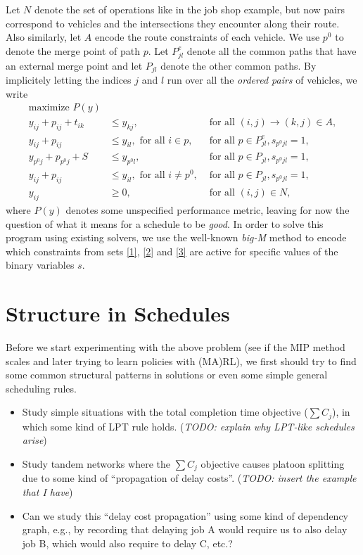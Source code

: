 \documentclass{article}
\begin{document}
Let $N$ denote the set of operations like in the job shop example, but now pairs
correspond to vehicles and the intersections they encounter along their route.
Also similarly, let $A$ encode the route constraints of each vehicle. We use
$p^{0}$ to denote the merge point of path $p$. Let $P_{jl}^{e}$ denote all the
common paths that have an external merge point and let $P_{jl}$ denote the other
common paths. By implicitely letting the indices $j$ and $l$ run over all the
\textit{ordered pairs} of vehicles, we write
%
\begin{subequations}
\begin{align}
  \text{maximize } P(y) \\
  y_{ij} + p_{ij} + t_{ik} &\leq y_{kj}, & \text{ for all } (i,j) \xrightarrow{} (k,j) \in A, \\
  \label{1} y_{ij} + p_{ij} &\leq y_{il}, \text{ for all } i \in p, &\text{ for all } p \in P_{jl}^{e}, s_{p^{0}jl} = 1, \\
  \label{2} y_{p^{0}j} + p_{p^{0}j} + S &\leq y_{p^{0}l},  &\text{ for all } p \in P_{jl}, s_{p^{0}jl} = 1, \\
  \label{3} y_{ij} + p_{ij} &\leq y_{il}, \text{ for all } i \neq p^{0}, &\text{ for all } p \in P_{jl}, s_{p^{0}jl} = 1, \\
  y_{ij} &\geq 0, & \text{ for all } (i,j) \in N ,
\end{align}
\end{subequations}
where $P(y)$ denotes some unspecified performance metric, leaving for now the
question of what it means for a schedule to be \textit{good}.
In order to solve this program using existing solvers, we use the well-known
\textit{big-M} method to encode which constraints from sets \eqref{1}, \eqref{2}
and \eqref{3} are active for specific values of the binary variables $s$.


\section{Structure in Schedules}

Before we start experimenting with the above problem (see if the MIP method
scales and later trying to learn policies with (MA)RL), we first should try to
find some common structural patterns in solutions or even some simple general
scheduling rules.

\begin{itemize}
  \item Study simple situations with the total completion time objective ($\sum C_{j}$), in which some kind of LPT rule holds. (\textit{TODO: explain why LPT-like schedules arise})
  \item Study tandem networks where the $\sum C_{j}$ objective causes platoon splitting due to some kind of ``propagation of delay costs''. (\textit{TODO: insert the example that I have})
  \item Can we study this ``delay cost propagation'' using some kind of dependency graph, e.g., by recording that delaying job A would require us to also delay job B, which would also require to delay C, etc.?
\end{itemize}
\end{document}
